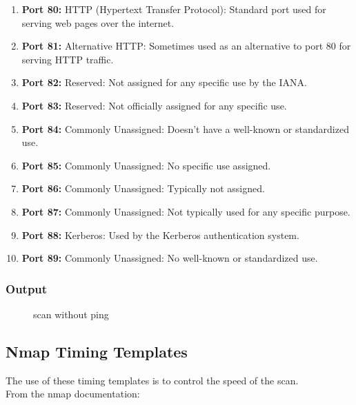 \documentclass[11pt]{article}
\begin{document}
\begin{enumerate}
    \item \textbf{Port 80:} HTTP (Hypertext Transfer Protocol): Standard port used for serving web pages over the internet.
    \item \textbf{Port 81:} Alternative HTTP: Sometimes used as an alternative to port 80 for serving HTTP traffic.
    \item \textbf{Port 82:} Reserved: Not assigned for any specific use by the IANA.
    \item \textbf{Port 83:} Reserved: Not officially assigned for any specific use.
    \item \textbf{Port 84:} Commonly Unassigned: Doesn't have a well-known or standardized use.
    \item \textbf{Port 85:} Commonly Unassigned: No specific use assigned.
    \item \textbf{Port 86:} Commonly Unassigned: Typically not assigned.
    \item \textbf{Port 87:} Commonly Unassigned: Not typically used for any specific purpose.
    \item \textbf{Port 88:} Kerberos: Used by the Kerberos authentication system.
    \item \textbf{Port 89:} Commonly Unassigned: No well-known or standardized use.
\end{enumerate}


\subsubsection*{Output}
\begin{figure}[H]
    \centering
    \caption{scan without ping}
    \label{fig:1}
\end{figure}


\subsection{Nmap Timing Templates}

\begin{figure}[H]
    \centering
    \caption{}
\end{figure}

The use of these timing templates is to control the speed of the scan.\\
From the nmap documentation:
\end{document}
